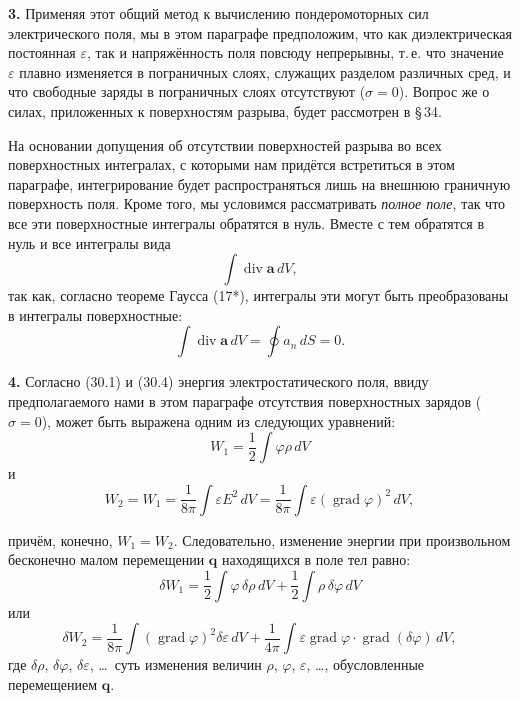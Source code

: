 \documentclass[a4paper,12pt]{article}
\begin{document}
\textbf{3.} Применяя этот общий метод к вычислению пондеромоторных сил
электрического поля, мы в этом параграфе предположим, что как
диэлектрическая постоянная $\varepsilon$, так и напряжённость поля
повсюду непрерывны, т.\,е. что значение $\varepsilon$ плавно изменяется
в пограничных слоях, служащих разделом различных сред, и что свободные
заряды в пограничных слоях отсутствуют ($\sigma = 0$). Вопрос же о
силах, приложенных к поверхностям разрыва, будет рассмотрен в §\,34.

На основании допущения об отсутствии поверхностей разрыва во всех
поверхностных интегралах, с которыми нам придётся встретиться в этом
параграфе, интегрирование будет распространяться лишь на внешнюю
граничную поверхность поля. Кроме того, мы условимся рассматривать
\textit{полное поле}, так что все эти поверхностные интегралы обратятся
в нуль. Вместе с тем обратятся в нуль и все интегралы вида
$$
    \int \operatorname{div}\mathbf{a}\,dV,
$$
так как, согласно теореме Гаусса (17*), интегралы эти могут быть
преобразованы в интегралы поверхностные:
\begin{equation}
    \int \operatorname{div}\mathbf{a}\,dV = \oint a_n\,dS = 0.
    \tag{32.5}
\end{equation}

\textbf{4.} Согласно (30.1) и (30.4) энергия электростатического поля,
ввиду предполагаемого нами в этом параграфе отсутствия поверхностных
зарядов ($\sigma = 0$), может быть выражена одним из следующих уравнений:
$$
    W_1 = \frac{1}{2}\int \varphi\rho\,dV
$$
и
$$
    W_2 = W_1 = \frac{1}{8\pi}\int \varepsilon E^2\,dV
              = \frac{1}{8\pi}\int \varepsilon(\operatorname{grad}\varphi)^2\,dV,
$$


причём, конечно, $W_1 = W_2$. Следовательно, изменение энергии при
произвольном бесконечно малом перемещении $\mathbf{q}$ находящихся
в поле тел равно:
$$
    \delta W_1 = \frac{1}{2}\int \varphi\,\delta\rho\,dV
               + \frac{1}{2}\int \rho\,\delta\varphi\,dV
$$
или
$$
    \delta W_2 = \frac{1}{8\pi}\int (\operatorname{grad}\varphi)^2
                 \delta\varepsilon\,dV
               + \frac{1}{4\pi}\int \varepsilon\operatorname{grad}\varphi\cdot
                 \operatorname{grad}(\delta\varphi)\,dV,
$$
где $\delta\rho$, $\delta\varphi$, $\delta\varepsilon$, \ldots\ суть
изменения величин $\rho$, $\varphi$, $\varepsilon$, \ldots,
обусловленные перемещением $\mathbf{q}$.
\end{document}
